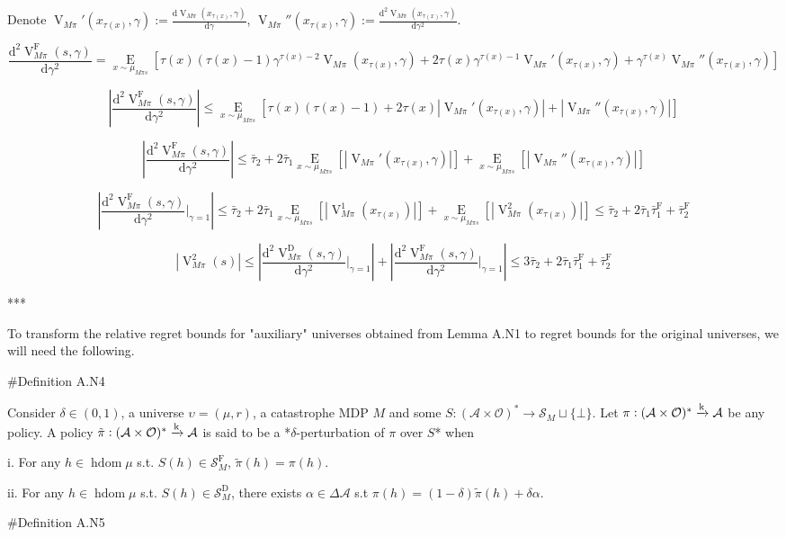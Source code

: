 \documentclass[a4paper]{article}
\newcommand{\AP}[1]{\left(#1\right)}
\newcommand{\AB}[1]{\left[#1\right]}
\newcommand{\Ea}[2]{\underset{#1}{\operatorname{E}}\AB{#2}}
\newcommand{\D}{\mathrm{d}}
\newcommand{\Abs}[1]{\left\vert #1 \right\vert}
\newcommand{\M}{\xrightarrow{\textnormal{k}}}
\newcommand{\Ob}{\mathcal{O}}
\newcommand{\A}{\mathcal{A}}
\newcommand{\St}{\mathcal{S}}
\newcommand{\FH}{(\A \times \Ob)^*}
\DeclareMathOperator{\HD}{hdom}
\newcommand{\RMD}{\mathrm{D}}
\newcommand{\RMF}{\mathrm{F}}
\newcommand{\SF}{\St^{\RMF}}
\newcommand{\SD}{\St^{\RMD}}
\newcommand{\V}{\operatorname{V}}
\begin{document}
Denote $\V_{M\pi}'\AP{x_{\tau(x)},\gamma}:=\frac{\D\V_{M\pi}\AP{x_{\tau(x)},\gamma}}{\D\gamma}$, $\V_{M\pi}''\AP{x_{\tau(x)},\gamma}:=\frac{\D^2\V_{M\pi}\AP{x_{\tau(x)},\gamma}}{\D\gamma^2}$.

$$\frac{\D^2\V_{M\pi}^\RMF(s,\gamma)}{\D\gamma^2} = \Ea{x\sim\mu_{M\pi s}}{\tau(x)\AP{\tau(x)-1}\gamma^{\tau(x)-2}\V_{M\pi}\AP{x_{\tau(x)},\gamma}+2\tau(x)\gamma^{\tau(x)-1}\V_{M\pi}'\AP{x_{\tau(x)},\gamma}+\gamma^{\tau(x)}\V_{M\pi}''\AP{x_{\tau(x)},\gamma}}$$

$$\Abs{\frac{\D^2\V_{M\pi}^\RMF(s,\gamma)}{\D\gamma^2}} \leq \Ea{x\sim\mu_{M\pi s}}{\tau(x)\AP{\tau(x)-1}+2\tau(x)\Abs{\V_{M\pi}'\AP{x_{\tau(x)},\gamma}}+\Abs{\V_{M\pi}''\AP{x_{\tau(x)},\gamma}}}$$

$$\Abs{\frac{\D^2\V_{M\pi}^\RMF(s,\gamma)}{\D\gamma^2}} \leq \bar{\tau}_2 + 2 \bar{\tau}_1 \Ea{x\sim\mu_{M\pi s}}{\Abs{\V_{M\pi}'\AP{x_{\tau(x)},\gamma}}}+\Ea{x\sim\mu_{M\pi s}}{\Abs{\V_{M\pi}''\AP{x_{\tau(x)},\gamma}}}$$

$$\Abs{\frac{\D^2\V_{M\pi}^\RMF(s,\gamma)}{\D\gamma^2}\bigg\vert_{\gamma=1}} \leq \bar{\tau}_2 + 2 \bar{\tau}_1 \Ea{x\sim\mu_{M\pi s}}{\Abs{\V_{M\pi}^1\AP{x_{\tau(x)}}}}+\Ea{x\sim\mu_{M\pi s}}{\Abs{\V_{M\pi}^2\AP{x_{\tau(x)}}}} \leq \bar{\tau}_2 + 2 \bar{\tau}_1 \bar{\tau}_1^\RMF +\bar{\tau}_2^\RMF$$

$$\Abs{\V_{M\pi}^2(s)} \leq \Abs{\frac{\D^2\V_{M\pi}^\RMD(s,\gamma)}{\D\gamma^2}\bigg\vert_{\gamma=1}}+\Abs{\frac{\D^2\V_{M\pi}^\RMF(s,\gamma)}{\D\gamma^2}\bigg\vert_{\gamma=1}} \leq 3 \bar{\tau}_2 + 2 \bar{\tau}_1 \bar{\tau}_1^\RMF +\bar{\tau}_2^\RMF$$

***

To transform the relative regret bounds for "auxiliary" universes obtained from Lemma A.N1 to regret bounds for the original universes, we will need the following.

\#Definition A.N4

Consider $\delta\in(0,1)$, a universe $\upsilon=(\mu,r)$, a catastrophe MDP $M$ and some $S: \FH \rightarrow \St_M \sqcup \{\bot\}$. Let $\pi: \FH \M \A$ be any policy. A policy $\tilde{\pi}: \FH \M \A$ is said to be a *$\delta$-perturbation of $\pi$ over $S$* when

i. For any $h \in \HD{\mu}$ s.t. $S(h)\in\SF_M$, $\tilde{\pi}(h)=\pi(h)$.

ii. For any $h \in \HD{\mu}$ s.t. $S(h)\in\SD_M$, there exists $\alpha\in\Delta\A$ s.t $\pi(h)=(1-\delta)\tilde{\pi}(h)+\delta\alpha$.

\#Definition A.N5
\end{document}
